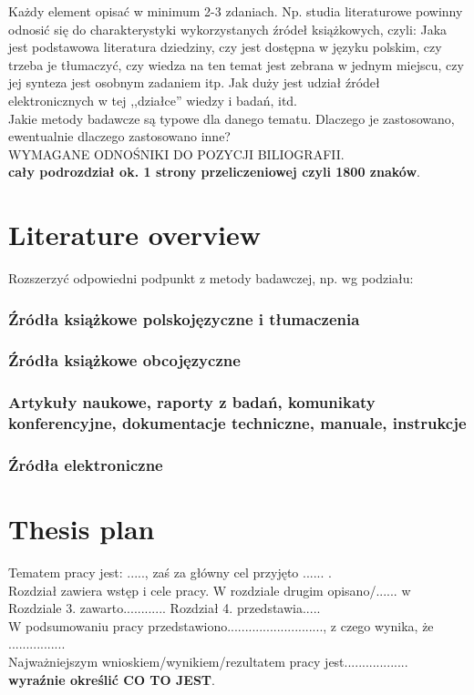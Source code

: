 \documentclass[12pt]{report}
\begin{document}
Każdy element opisać w minimum 2-3 zdaniach. Np. studia literaturowe powinny
odnosić się do charakterystyki wykorzystanych źródeł książkowych, czyli: Jaka
jest podstawowa literatura dziedziny, czy jest dostępna w języku polskim, czy trzeba je tłumaczyć, czy wiedza na ten
temat jest zebrana w jednym miejscu, czy jej synteza jest osobnym zadaniem itp. 
Jak duży jest udział źródeł elektronicznych w tej ,,działce'' wiedzy i badań,
itd. \\
\indent Jakie metody badawcze są typowe dla danego tematu. Dlaczego je
zastosowano, ewentualnie dlaczego zastosowano inne? \\
WYMAGANE ODNOŚNIKI DO POZYCJI BILIOGRAFII.\\
{\bf cały podrozdział ok. 1 strony przeliczeniowej czyli 1800 znaków}.

\section{Literature overview} %
Rozszerzyć odpowiedni podpunkt z metody badawczej, np. wg podziału:
\subsubsection{Źródła książkowe polskojęzyczne i tłumaczenia}
\subsubsection{Źródła książkowe obcojęzyczne}
\subsubsection{Artykuły naukowe, raporty z badań, komunikaty konferencyjne,
dokumentacje techniczne, manuale, instrukcje}
\subsubsection{Źródła elektroniczne}


\section{Thesis plan}
Tematem pracy jest: ....., zaś za główny cel przyjęto ...... . \\
Rozdział \label{rozdz.wstep} zawiera wstęp i cele pracy. W rozdziale drugim
opisano/...... w Rozdziale 3. zawarto............ Rozdział 4. przedstawia..... \\
W podsumowaniu pracy przedstawiono..........................., z czego wynika,
że ................  \\
Najważniejszym wnioskiem/wynikiem/rezultatem pracy jest..................\\ {\bf wyraźnie określić
CO TO JEST}. \\
\end{document}
